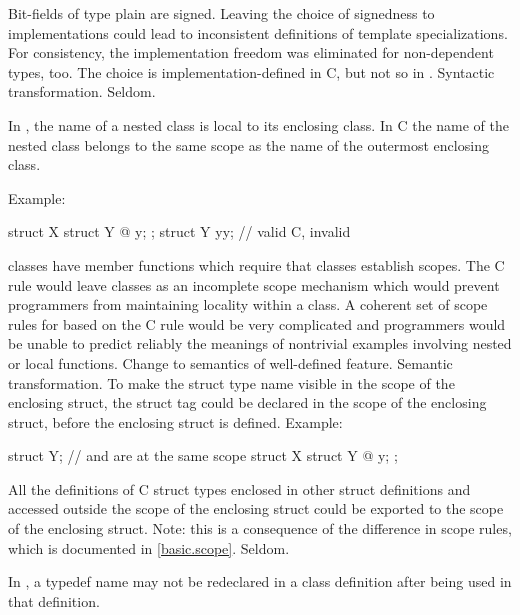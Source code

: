 \change
{}%
Bit-fields of type plain  are signed.
\rationale
Leaving the choice of signedness to implementations could lead to
inconsistent definitions of template specializations. For consistency,
the implementation freedom was eliminated for non-dependent types,
too.
\effect
The choice is implementation-defined in C, but not so in \Cpp{}.
\difficulty
Syntactic transformation.
\howwide
Seldom.

\change
In \Cpp{}, the name of a nested class is local to its enclosing class. In C
the name of the nested class belongs to the same scope as the name of the outermost enclosing class.

Example:

\begin{codeblock}
struct X {
  struct Y { @\commentellip@ } y;
};
struct Y yy;                    // valid C, invalid \Cpp{}
\end{codeblock}
\rationale
\Cpp{} classes have member functions which require that classes
establish scopes.
The C rule would leave classes as an incomplete scope mechanism
which would prevent \Cpp{} programmers from maintaining locality
within a class.
A coherent set of scope rules for \Cpp{} based on the C rule would
be very complicated and \Cpp{} programmers would be unable to predict
reliably the meanings of nontrivial examples involving nested or
local functions.
\effect
Change to semantics of well-defined feature.
\difficulty
Semantic transformation.
To make the struct type name visible in the scope of the enclosing
struct, the struct tag could be declared in the scope of the
enclosing struct, before the enclosing struct is defined.
Example:

\begin{codeblock}
struct Y;                       //  and  are at the same scope
struct X {
  struct Y { @\commentellip@ } y;
};
\end{codeblock}

All the definitions of C struct types enclosed in other struct
definitions and accessed outside the scope of the enclosing
struct could be exported to the scope of the enclosing struct.
Note: this is a consequence of the difference in scope rules,
which is documented in \ref{basic.scope}.
\howwide
Seldom.

\change
In \Cpp{}, a typedef name may not be redeclared in a class definition after being used in that definition.

